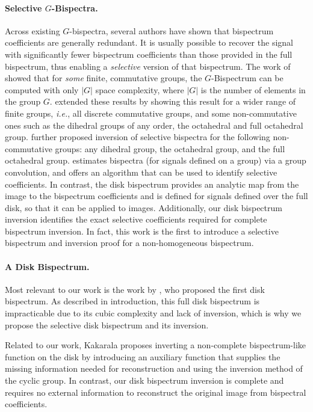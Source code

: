 \paragraph{Selective $G$-Bispectra.} Across existing $G$-bispectra, several authors have shown that bispectrum coefficients are generally redundant. It is usually possible to recover the signal with significantly fewer bispectrum coefficients than those provided in the full bispectrum, thus enabling a \textit{selective} version of that bispectrum. The work of \citep{giannakis1989signal, kakarala_thesis, sadler1992shift} showed that for \textit{some} finite, commutative groups, the $G$-Bispectrum can be computed with only $|G|$ space complexity, where $|G|$ is the number of elements in the group $G$. \citet{  mataigne2024selective} extended these results by showing this result for a wider range of finite groups, \textit{i.e.}, all discrete commutative groups, and some non-commutative ones such as the dihedral groups of any order, the octahedral and full octahedral group. \cite{ mataigne2024selective} further proposed inversion of selective bispectra for the following non-commutative groups: any dihedral group, the octahedral group, and the full octahedral group. \cite{  mataigne2024selective} estimates bispectra (for signals defined on a group) via a group convolution, and offers an algorithm that can be used to identify selective coefficients. In contrast, the disk bispectrum provides an analytic map from the image to the bispectrum coefficients and is defined for signals defined over the full disk, so that it can be applied to images. Additionally, our disk bispectrum inversion identifies the exact selective coefficients required for complete bispectrum inversion. In fact, this work is the first to introduce a selective bispectrum and inversion proof for a non-homogeneous bispectrum.

\paragraph{A Disk Bispectrum.} Most relevant to our work is the work by \citet{zhao2014rotationally}, who proposed the first disk bispectrum. As described in introduction, this full disk bispectrum is impracticable due to its cubic complexity and lack of inversion, which is why we propose the selective disk bispectrum and its inversion.

Related to our work, Kakarala \cite{kakarala2012} proposes inverting a non-complete bispectrum-like function on the disk by introducing an auxiliary function that supplies the missing information needed for reconstruction and using the inversion method of the cyclic group. In contrast, our disk bispectrum inversion is complete and requires no external information to reconstruct the original image from bispectral coefficients.


